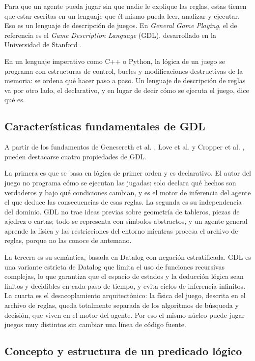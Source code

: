 Para que un agente pueda jugar sin que nadie le explique las reglas, estas tienen que estar escritas en un lenguaje que él mismo pueda leer, analizar y ejecutar. Eso es un lenguaje de descripción de juegos. En \textit{General Game Playing}, el de referencia es el \textit{Game Description Language} (GDL), desarrollado en la Universidad de Stanford \cite{Love2008GDL, Genesereth2005GGP}.

En un lenguaje imperativo como C++ o Python, la lógica de un juego se programa con estructuras de control, bucles y modificaciones destructivas de la memoria: se ordena qué hacer paso a paso. Un lenguaje de descripción de reglas va por otro lado, el declarativo, y en lugar de decir cómo se ejecuta el juego, dice qué es.

\subsection{Características fundamentales de GDL}

A partir de los fundamentos de Genesereth et al. \cite{Genesereth2005GGP}, Love et al. \cite{Love2008GDL} y Cropper et al. \cite{Cropper2019IGGP}, pueden destacarse cuatro propiedades de GDL.

La primera es que se basa en lógica de primer orden y es declarativo. El autor del juego no programa cómo se ejecutan las jugadas: solo declara qué hechos son verdaderos y bajo qué condiciones cambian, y es el motor de inferencia del agente el que deduce las consecuencias de esas reglas. La segunda es su independencia del dominio. GDL no trae ideas previas sobre geometría de tableros, piezas de ajedrez o cartas; todo se representa con símbolos abstractos, y un agente general aprende la física y las restricciones del entorno mientras procesa el archivo de reglas, porque no las conoce de antemano.

La tercera es su semántica, basada en Datalog con negación estratificada. GDL es una variante estricta de Datalog que limita el uso de funciones recursivas complejas, lo que garantiza que el espacio de estados y la deducción lógica sean finitos y decidibles en cada paso de tiempo, y evita ciclos de inferencia infinitos. La cuarta es el desacoplamiento arquitectónico: la física del juego, descrita en el archivo de reglas, queda totalmente separada de los algoritmos de búsqueda y decisión, que viven en el motor del agente. Por eso el mismo núcleo puede jugar juegos muy distintos sin cambiar una línea de código fuente.

\subsection{Concepto y estructura de un predicado lógico}
\label{subsec:predicado_logico}


